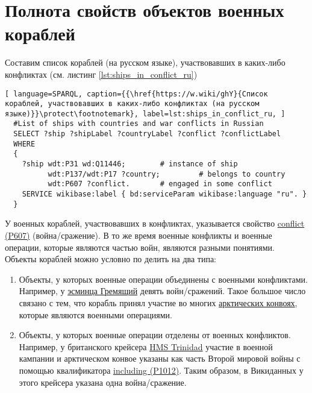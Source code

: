 \section{Полнота свойств объектов военных кораблей}

Составим список кораблей (на русском языке), участвовавших в каких-либо конфликтах (см. листинг \ref{lst:ships_in_conflict_ru})

\begin{lstlisting}[ language=SPARQL, caption={{\href{https://w.wiki/ghY}{Список кораблей, участвовавших в каких-либо конфликтах (на русском языке)}}\protect\footnotemark}, label=lst:ships_in_conflict_ru, ]
  #List of ships with countries and war conflicts in Russian
  SELECT ?ship ?shipLabel ?countryLabel ?conflict ?conflictLabel
  WHERE
  {
    ?ship wdt:P31 wd:Q11446;        # instance of ship
          wdt:P137/wdt:P17 ?country;         # belongs to country
          wdt:P607 ?conflict.       # engaged in some conflict
    SERVICE wikibase:label { bd:serviceParam wikibase:language "ru". }
  }
\end{lstlisting}

У военных кораблей, участвовавших в конфликтах, указывается свойство \href{https://www.wikidata.org/wiki/Property:P607}{conflict (P607)} (война/сражение). В то же время военные конфликты и военные операции, которые являются частью войн, являются разными понятиями. Объекты кораблей можно условно по делить на два типа:

\begin{enumerate}
  \item Объекты, у которых военные операции объединены с военными конфликтами. Например, у \href{https://www.wikidata.org/wiki/Q4148613}{эсминца Гремящий} девять войн/сражений. Такое большое число связано с тем, что корабль принял участие во многих \href{https://ru.wikipedia.org/wiki/Арктические_конвои}{арктических конвоях}, которые являются военными операциями.
  \item Объекты, у которых военные операции отделены от военных конфликтов. Например, у британского крейсера \href{https://ru.wikipedia.org/wiki/HMS_Trinidad_(1940)}{HMS Trinidad} участие в военной кампании и арктическом конвое указаны как часть Второй мировой войны с помощью квалификатора \href{https://www.wikidata.org/wiki/Property:P1012}{including (P1012)}. Таким образом, в Викиданных у этого крейсера указана одна война/сражение.
\end{enumerate}

